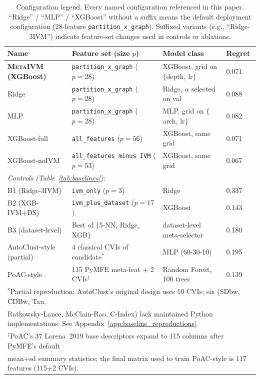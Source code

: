 \documentclass[10pt]{article} %
\newcommand{\ours}{\textsc{MetaIVM}}
\begin{document}
\begin{table}[t]
\centering
\caption{Configuration legend. Every named configuration referenced in this paper. ``Ridge'' / ``MLP'' / ``XGBoost'' without a suffix means the default deployment configuration (28-feature \texttt{partition\_x\_graph}). Suffixed variants (e.g., ``Ridge-3IVM'') indicate feature-set changes used in controls or ablations.}
\label{tab:configs}
\small
\begin{tabular}{llll}
\toprule
\textbf{Name} & \textbf{Feature set (size $p$)} & \textbf{Model class} & \textbf{Regret} \\
\midrule
\textbf{\ours{} (XGBoost)} & \texttt{partition\_x\_graph} ($p=28$) & XGBoost, grid on $\{$depth, lr$\}$ & 0.071 \\
Ridge & \texttt{partition\_x\_graph} ($p=28$) & Ridge, $\alpha$ selected on val & 0.088 \\
MLP & \texttt{partition\_x\_graph} ($p=28$) & MLP, grid on $\{$arch, lr$\}$ & 0.082 \\
XGBoost-full & \texttt{all\_features} ($p=56$) & XGBoost, same grid & 0.071 \\
XGBoost-noIVM & \texttt{all\_features minus IVM} ($p=53$) & XGBoost, same grid & 0.067 \\
\midrule
\multicolumn{4}{l}{\textit{Controls (Table~\ref{tab:baselines}):}} \\
B1 (Ridge-3IVM) & \texttt{ivm\_only} ($p=3$) & Ridge & 0.337 \\
B2 (XGB-IVM+DS) & \texttt{ivm\_plus\_dataset} ($p=17$) & XGBoost & 0.143 \\
B3 (dataset-level) & Best of $\{$5-NN, Ridge, XGB$\}$ & dataset-level meta-selector & 0.180 \\
AutoClust-style (partial) & 4 classical CVIs of candidate$^\ast$ & MLP (60-30-10) & 0.195 \\
PoAC-style & 115 PyMFE meta-feat + 2 CVIs$^\dagger$ & Random Forest, 100 trees & 0.139 \\
\bottomrule
\multicolumn{4}{l}{\footnotesize $^\ast$Partial reproduction: AutoClust's original design uses 10 CVIs; six (SDbw, CDBw, Tau,} \\
\multicolumn{4}{l}{\footnotesize Ratkowsky-Lance, McClain-Rao, C-Index) lack maintained Python implementations. See Appendix~\ref{app:baseline_reproductions}.} \\
\multicolumn{4}{l}{\footnotesize $^\dagger$PoAC's 37 Lorena~2019 base descriptors expand to 115 columns after PyMFE's default} \\
\multicolumn{4}{l}{\footnotesize mean+sd summary statistics; the final matrix used to train PoAC-style is 117 features (115+2 CVIs).}
\end{tabular}
\end{table}
\end{document}
